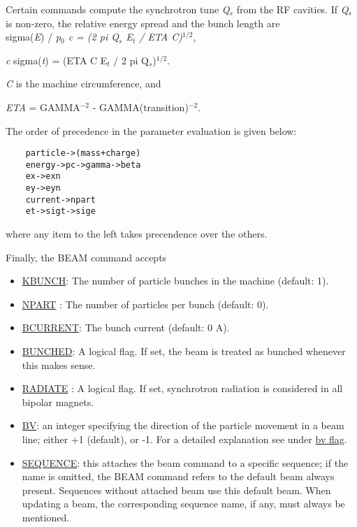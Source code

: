 
Certain commands compute the synchrotron tune \textit{Q$_s$} from the RF
cavities. If \textit{Q$_s$} is non-zero, the relative energy spread and
the bunch length are  \\
sigma(\textit{E}) / \textit{p$_0$ c =  (2 pi Q$_s$ E$_t$ / ETA C)$^{1/2}$}, 

\textit{c} sigma(\textit{t}) = (ETA C E$_t$ / 2 pi Q$_s$)$^{1/2}$. 

\textit{C} is the machine circumference, and 

\textit{ETA} = GAMMA$^{-2}$ - GAMMA(transition)$^{-2}$. 

The order of precedence in the parameter evaluation is given below: 
\begin{verbatim}
    particle->(mass+charge)
    energy->pc->gamma->beta
    ex->exn
    ey->eyn
    current->npart
    et->sigt->sige
\end{verbatim} 

where any item to the left takes precendence over the others. 

Finally, the BEAM command accepts 
\begin{itemize}
   \item \href{kbunch}{KBUNCH}: The number of particle bunches in the
     machine (default: 1).  
   \item \href{npart}{NPART} \label{beam_npart}: The number of particles per bunch (default: 0). 
   \item \href{bcurrent}{BCURRENT}: The bunch current (default: 0 A). 
   \item \href{bunched}{BUNCHED}: A logical flag. If set, the beam is
     treated as bunched whenever this makes sense.  
   \item \href{radiate}{RADIATE} \label{beam_radiate}: A logical flag. If set, synchrotron
     radiation is considered in all bipolar magnets.  
   \item \href{bv}{BV}: an integer specifying the direction of the
     particle movement in a beam line; either +1 (default), or -1. For a
     detailed explanation see under \href{bv_flag.html}{bv flag}.  
   \item \href{sequence}{SEQUENCE}: this attaches the beam command to a
     specific sequence; if the name is omitted, the BEAM command refers
     to the default beam always present. Sequences without attached beam
     use this default beam. When updating a beam, the corresponding
     sequence name, if any, must always be mentioned.  
\end{itemize} 

